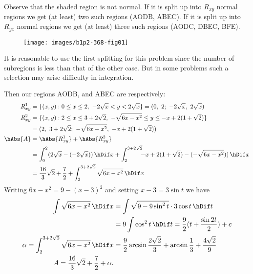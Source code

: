 \documentclass[11pt]{amsbook}
\begin{document}

Observe that the shaded region is not normal. If it is split up into $R_{xy}$ normal regions we get (at least) two such regions (AODB, ABEC). If it is split up into $R_{yx}$ normal regions we get (at least) three such regions (AODC, DBEC, BFE).
\begin{figure}[htbp]
	\centering
	\texttt{[image: images/b1p2-368-fig01]}
\end{figure}

It is reasonable to use the first splitting for this problem since the number of subregions is less than that of the other case. But in some problems such a selection may arise difficulty in integration.

Then our regions AODB, and ABEC are respectively:
\begin{align*}
	R_{xy}^{1} &= 
		\{ (x, y): 
		0 \leq x \leq 2,
		\ -2\sqrt{x} < y < 2\sqrt{x} \} 
		= (0,\ 2;
		\ -2\sqrt{x},\ 2\sqrt{x})  \\
	R_{xy}^{2} &= 
		\{ (x, y): 
		2 \leq x \leq 3+2\sqrt{2},
		\ -\sqrt{6x-x^{2}} \leq y \leq -x+2(1+\sqrt{2})\} \\
		& = (2,\ 3+2\sqrt{2};
		\ -\sqrt{6x-x^{2}},\ -x+2(1+\sqrt{2})) \\
	\hAbs{A} & = 
		\hAbs{R_{xy}^{1}}+\hAbs{R_{xy}^{2}} \\
	& = \int_{0}^{2} 
		(2\sqrt{x}-(-2\sqrt{x})) \, \hDif x 
		+\int_{2}^{3+2\sqrt{2}} 
			\!\!\! -x+2(1+\sqrt{2})-(-\sqrt{6x-x^{2}})) \, \hDif x \\
	& = \frac{16}{3} \sqrt{2} 
		+ \frac{7}{2} 
		+ \int_{2}^{3+2\sqrt{2}} 
			\sqrt{6x-x^{2}} \, \hDif x
\end{align*}
Writing $6x-x^{2}=9-(x-3)^{2}$ and setting $x-3=3\sin t$ we have
\begin{align*}
	\int \sqrt{6x-x^{2}} \, \hDif x 
	&= \int 
		\sqrt{9-9 \sin^{2} t} \cdot 3 \cos t \, \hDif t \\
	& = 9 \int 
		\cos^{2} t \, \hDif t 
	= \frac{9}{2} (t+ \frac{\sin 2t}{2}) + c \\
	\alpha = 
		\int_{2}^{3+2\sqrt{2}} 
			\sqrt{6x-x^{2}} \, \hDif x
	&= \frac{9}{2} \arcsin \frac{2 \sqrt{2}}{3} 
		+ \arcsin \frac{1}{3} + \frac{4 \sqrt{2}}{9}\\
	A = \frac{16}{3} \sqrt{2} + \frac{7}{2} + \alpha .
\end{align*}

%
%


\end{document}
